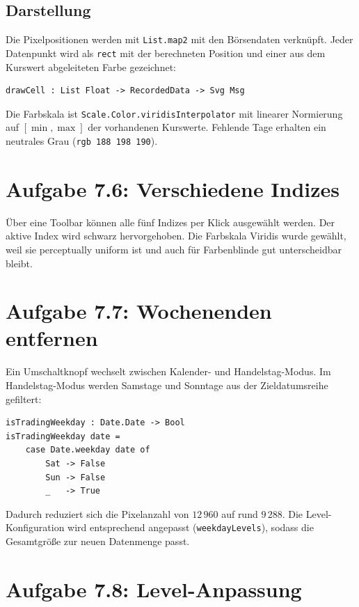 \documentclass[11pt,a4paper]{article}
\begin{document}
\subsection*{Darstellung}

Die Pixelpositionen werden mit \texttt{List.map2} mit den Börsendaten
verknüpft. Jeder Datenpunkt wird als \texttt{rect} mit der berechneten
Position und einer aus dem Kurswert abgeleiteten Farbe gezeichnet:

\begin{verbatim}
drawCell : List Float -> RecordedData -> Svg Msg
\end{verbatim}

Die Farbskala ist \texttt{Scale.Color.viridisInterpolator} mit linearer
Normierung auf $[\min, \max]$ der vorhandenen Kurswerte. Fehlende Tage
erhalten ein neutrales Grau (\texttt{rgb 188 198 190}).

\section*{Aufgabe 7.6: Verschiedene Indizes}

Über eine Toolbar können alle fünf Indizes per Klick ausgewählt werden. Der
aktive Index wird schwarz hervorgehoben. Die Farbskala Viridis wurde gewählt,
weil sie perceptually uniform ist und auch für Farbenblinde gut unterscheidbar
bleibt.

\section*{Aufgabe 7.7: Wochenenden entfernen}

Ein Umschaltknopf wechselt zwischen Kalender- und Handelstag-Modus. Im
Handelstag-Modus werden Samstage und Sonntage aus der Zieldatumsreihe
gefiltert:

\begin{verbatim}
isTradingWeekday : Date.Date -> Bool
isTradingWeekday date =
    case Date.weekday date of
        Sat -> False
        Sun -> False
        _   -> True
\end{verbatim}

Dadurch reduziert sich die Pixelanzahl von $12\,960$ auf rund $9\,288$.
Die Level-Konfiguration wird entsprechend angepasst (\texttt{weekdayLevels}),
sodass die Gesamtgröße zur neuen Datenmenge passt.

\section*{Aufgabe 7.8: Level-Anpassung}
\end{document}
